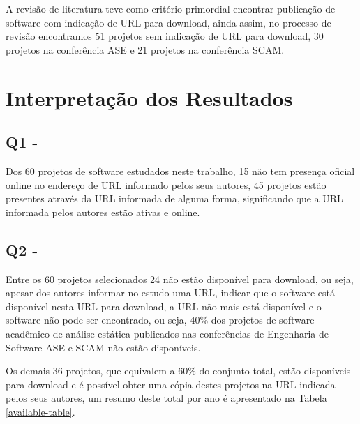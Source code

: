 A revisão de literatura teve como critério primordial encontrar publicação de
software com indicação de URL para download, ainda assim, no processo de
revisão encontramos 51 projetos sem indicação de URL para download, 30 projetos
na conferência ASE e 21 projetos na conferência SCAM.



\section{Interpretação dos Resultados} \label{estudo1:interpretacao}

\subsection{Q1 - \EstudoUmQuestaoUm} %

Dos 60 projetos de software estudados neste trabalho, 15 não tem presença
oficial online no endereço de URL informado pelos seus autores, 45 projetos estão presentes através da
URL informada de alguma forma, significando que a URL informada pelos autores
estão ativas e online. %

\subsection{Q2 - \EstudoUmQuestaoDois} %

Entre os 60 projetos selecionados 24 não estão disponível para download, ou
seja, apesar dos autores informar no estudo uma URL, indicar que o software
está disponível nesta URL para download, a URL não mais está disponível e o
software não pode ser encontrado, ou seja, 40\% dos projetos de software
acadêmico de análise estática publicados nas conferências de Engenharia de
Software ASE e SCAM não estão disponíveis.

Os demais 36 projetos, que equivalem a 60\% do conjunto total, estão
disponíveis para download e é possível obter uma cópia destes projetos na URL
indicada pelos seus autores, um resumo deste total por ano é apresentado na
Tabela \ref{available-table}.

